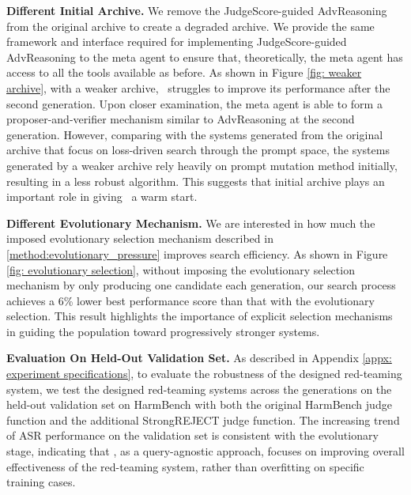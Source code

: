\textbf{Different Initial Archive.}
\label{appx: degraded archive}
We remove the JudgeScore-guided AdvReasoning from the original archive to create a degraded archive. We provide the same framework and interface required for implementing JudgeScore-guided AdvReasoning to the meta agent to ensure that, theoretically, the meta agent has access to all the tools available as before. As shown in Figure \ref{fig: weaker archive}, with a weaker archive, \method~struggles to improve its performance after the second generation. Upon closer examination, the meta agent is able to form a proposer-and-verifier mechanism similar to AdvReasoning at the second generation. However, comparing with the systems generated from the original archive that focus on loss-driven search through the prompt space, the systems generated by a weaker archive rely heavily on prompt mutation method initially, resulting in a less robust algorithm. This suggests that initial archive plays an important role in giving \method~a warm start.

\textbf{Different Evolutionary Mechanism.}
\label{appx: evolutionary selection}
We are interested in how much the imposed evolutionary selection mechanism described in \ref{method:evolutionary_pressure} improves search efficiency. As shown in Figure \ref{fig: evolutionary selection}, without imposing the evolutionary selection mechanism by only producing one candidate each generation, our search process achieves a 6\% lower best performance score than that with the evolutionary selection. This result highlights the importance of explicit selection mechanisms in guiding the population toward progressively stronger systems. %

\textbf{Evaluation On Held-Out Validation Set.}
\label{appx: held-out test}
As described in Appendix \ref{appx: experiment specifications}, to evaluate the robustness of the designed red-teaming system, we test the designed red-teaming systems across the generations on the held-out validation set on HarmBench with both the original HarmBench judge function and the additional StrongREJECT judge function. The increasing trend of ASR performance on the validation set is consistent with the evolutionary stage, indicating that \method, as a query-agnostic approach, focuses on improving overall effectiveness of the red-teaming system, rather than overfitting on specific training cases.

